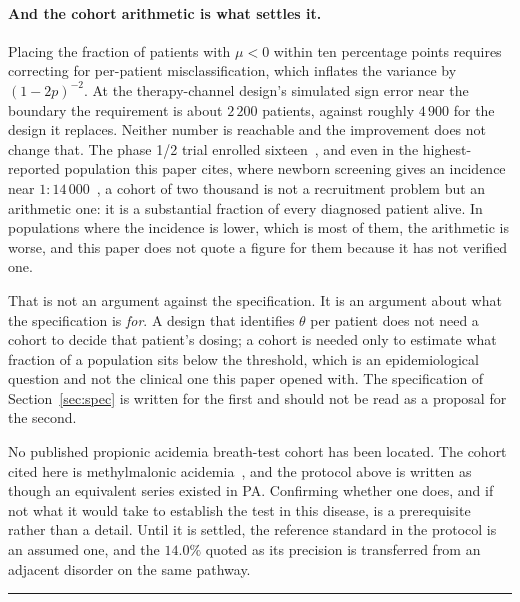 \paragraph{And the cohort arithmetic is what settles it.} Placing the fraction of patients
with $\mu<0$ within ten percentage points requires correcting for per-patient
misclassification, which inflates the variance by $(1-2p)^{-2}$. At the therapy-channel
design's simulated sign error near the boundary the requirement is about $2\,200$ patients,
against roughly $4\,900$ for the design it replaces. Neither number is reachable and
the improvement does not change that. The phase 1/2 trial enrolled
sixteen~\cite{trial_phase12}, %
and even in the highest-reported population this paper cites, where newborn screening gives
an incidence near $1{:}14\,000$~\cite{nbs_saudi_national}, %
a cohort of two thousand is not a recruitment problem but an arithmetic one: it is a
substantial fraction of every diagnosed patient alive. In populations where the incidence is
lower, which is most of them, the arithmetic is worse, and this paper does not quote a
figure for them because it has not verified one.

That is not an argument against the specification. It is an argument about what the
specification is \emph{for}. A design that identifies $\theta$ per patient does not
need a cohort to decide that patient's dosing; a cohort is needed only to estimate what
fraction of a population sits below the threshold, which is an epidemiological question and
not the clinical one this paper opened with. The specification of Section~\ref{sec:spec} is
written for the first and should not be read as a proposal for the second.

\begin{remark}
\label{rem:no_pa_breath}
No published propionic acidemia breath-test cohort has been located. The cohort
cited here is methylmalonic acidemia~\cite{breath_test_mma}, %
and the protocol above is written as though an equivalent series existed in PA. Confirming
whether one does, and if not what it would take to establish the test in this disease, is a
prerequisite rather than a detail. Until it is settled, the reference standard in the
protocol is an assumed one, and the $14.0\%$ quoted as its precision is transferred from an
adjacent disorder on the same pathway.
\end{remark}

\vspace{0.5em}
\hrule
\vspace{1em}

